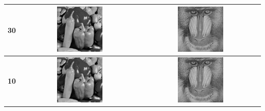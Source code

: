 \documentclass{article}
\begin{document}
\begin{center}
\hspace*{-2.5cm}
\begin{tabular}{@{}ccc}
\textbf{30} & 
\includegraphics[width=0.4\textwidth]{pep30}
&
\includegraphics[width=0.4\textwidth]{bab30}
\\ \hline
\textbf{10} & 
\includegraphics[width=0.4\textwidth]{pep10}
&
\includegraphics[width=0.4\textwidth]{bab10}
\\
\end{tabular}
\hspace*{-2.5cm}
\end{center}
\end{document}
